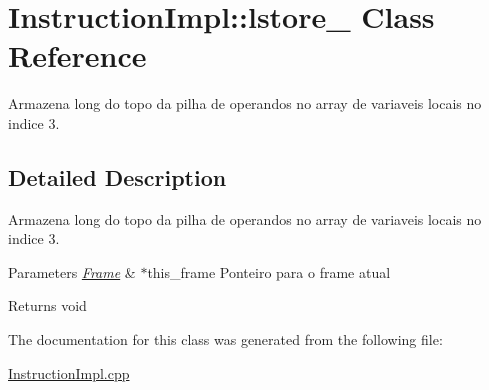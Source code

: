 \hypertarget{class_instruction_impl_1_1lstore__3}{}\section{Instruction\+Impl\+:\+:lstore\+\_ Class Reference}
\label{class_instruction_impl_1_1lstore__3}


Armazena long do topo da pilha de operandos no array de variaveis locais no indice 3.  




\subsection{Detailed Description}
Armazena long do topo da pilha de operandos no array de variaveis locais no indice 3. 


\begin{DoxyParams}{Parameters}
{\em \hyperlink{struct_frame}{Frame}} & $\ast$this\+\_\+frame Ponteiro para o frame atual \\
\hline
\end{DoxyParams}
\begin{DoxyReturn}{Returns}
void 
\end{DoxyReturn}


The documentation for this class was generated from the following file\+:\begin{DoxyCompactItemize}
\item 
\hyperlink{_instruction_impl_8cpp}{Instruction\+Impl.\+cpp}\end{DoxyCompactItemize}

